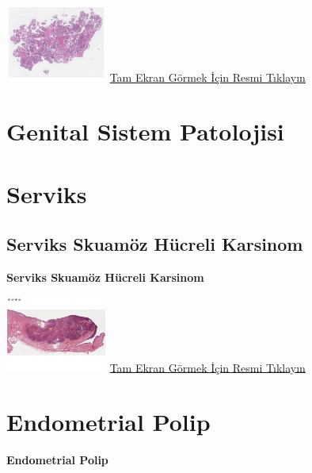 \documentclass[
  letterpaper,
  DIV=11,
  numbers=noendperiod]{scrreprt}
\begin{document}
\href{https://images.patolojiatlasi.com/ovarianserousmicropapillary/HE.html}{\includegraphics[width=0.25\textwidth,height=\textheight]{./screenshots/thumbnail_ovarianserousmicropapillary.png}}
\href{https://images.patolojiatlasi.com/ovarianserousmicropapillary/HE.html}{Tam
Ekran Görmek İçin Resmi Tıklayın}

\hypertarget{sec-genital-sistem-patolojisi}{%
\chapter{Genital Sistem
Patolojisi}\label{sec-genital-sistem-patolojisi}}

\hypertarget{sec-serviks}{%
\chapter{Serviks}\label{sec-serviks}}

\hypertarget{sec-serviks-skuamoz-hucreli-karsinom}{%
\section{Serviks Skuamöz Hücreli
Karsinom}\label{sec-serviks-skuamoz-hucreli-karsinom}}

\textbf{Serviks Skuamöz Hücreli Karsinom}

\href{https://images.patolojiatlasi.com/cervix-SCC/HE.html}{\includegraphics[width=0.25\textwidth,height=\textheight]{./screenshots/thumbnail_cervix-SCC.png}}
\href{https://images.patolojiatlasi.com/cervix-SCC/HE.html}{Tam Ekran
Görmek İçin Resmi Tıklayın}

\hypertarget{sec-endometrial-polip}{%
\chapter{Endometrial Polip}\label{sec-endometrial-polip}}

\textbf{Endometrial Polip}
\end{document}
